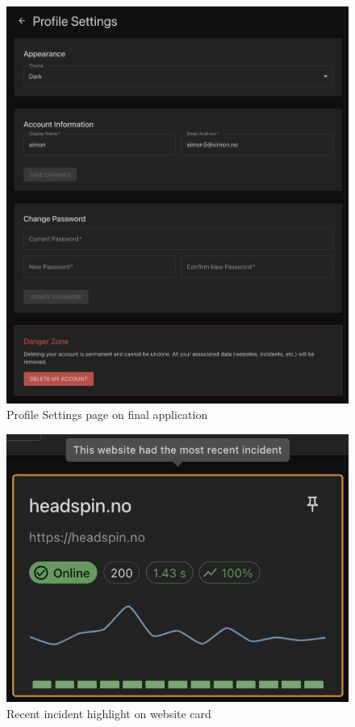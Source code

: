 \begin{figure}
    \centering
    \includegraphics[width=1\linewidth]{figures/final_application/final_profilesettings.png}
    \caption{Profile Settings page on final application}
    \label{fig:app_profilesettings}
\end{figure}

\begin{figure}
    \centering
    \includegraphics[width=1\linewidth]{figures/final_application/final_recentincident_highlight.png}
    \caption{Recent incident highlight on website card}
    \label{fig:app_recentincident_highlight}
\end{figure}


